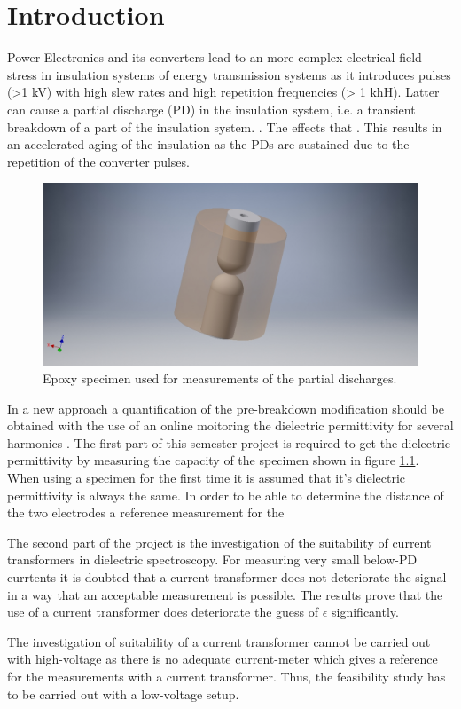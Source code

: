 
\chapter{Introduction}
Power Electronics and its converters lead to an more complex electrical field stress in insulation systems of energy transmission systems as it introduces pulses (>1 kV) with high slew rates and high repetition frequencies (> 1 khH). Latter can cause a partial discharge (PD) in the insulation system, i.e. a transient breakdown of a part of the insulation system. \cite{TransformerEngineering}. The effects that . This results in an accelerated aging of the insulation as the PDs are sustained due to the repetition of the converter pulses. 
\newline


\begin{figure}
\includegraphics[width=\textwidth]{figures/intro/epoxy_specimen.jpg}
	\caption{Epoxy specimen used for measurements of the partial discharges.}
	\label{fig.specimen}
\end{figure}
In a new approach a quantification of the pre-breakdown modification should be obtained with the use of an online moitoring the dielectric permittivity for several harmonics \cite{FaerberMVISS}.
The first part of this semester project is required to get the dielectric permittivity by measuring the capacity of the specimen shown in figure \ref{fig.specimen}. When using a specimen for the first time it is assumed that it's dielectric permittivity is always the same. In order to be able to determine the distance of the two electrodes a reference measurement for the 

The second part of the project is the investigation of the suitability of current transformers in dielectric spectroscopy. For measuring very small below-PD currtents it is doubted that a current transformer does not deteriorate the signal in a way that an acceptable measurement is possible. The results prove that the use of a current transformer does deteriorate the guess of $\epsilon$ significantly. 

The investigation of suitability of a current transformer cannot be carried out with high-voltage as there is no adequate current-meter which gives a reference for the measurements with a current transformer. Thus, the feasibility study has to be carried out with a low-voltage setup. 

